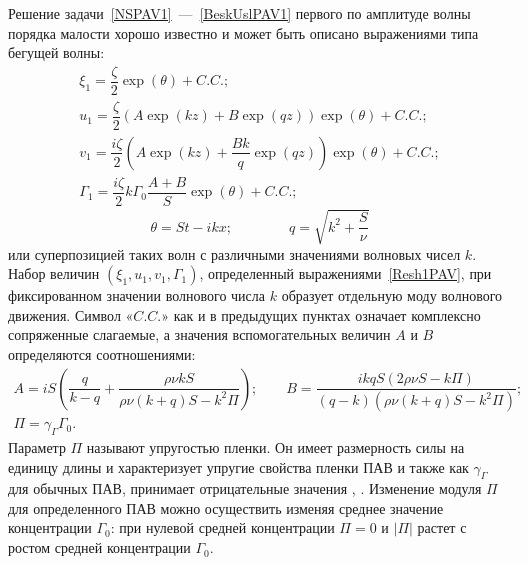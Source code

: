   Решение задачи~\eqref{NSPAV1}~---~\eqref{BeskUslPAV1} первого по амплитуде волны порядка малости хорошо известно \parencite{BelonozhkoPav2004, vakbib1} и может быть описано выражениями типа бегущей волны:
  \begin{equation}
  \begin{matrix}
  \xi_{1}=\dfrac{\zeta}{2} \exp \left( \theta \right) +C.C.;\\
  u_{1}=\dfrac{\zeta}{2}\left(A \exp \left( k z \right) +B \exp \left( q z \right) \right) \exp \left( \theta \right) +C.C.;\\
  v_{1}=\dfrac{i \zeta}{2}\left(A \exp \left( k z \right) +\dfrac{B k}{q}\exp \left( q z \right) \right) \exp \left( \theta \right) +C.C.;\\
    \Gamma_{1}=\dfrac{i \zeta}{2} k \Gamma_{0} \dfrac{A+B}{S} \exp \left( \theta \right) +C.C.;
  \end{matrix}
  \label{Resh1PAV}
  \end{equation}
  \begin{equation*}
  \qquad \qquad \theta=S t - i k x; \qquad \qquad q=\sqrt{k^{2} + \dfrac{S}{\nu}} \qquad \qquad
  \end{equation*}
или суперпозицией таких волн с различными значениями волновых чисел $ k $. Набор величин $ \left( \xi_{1}, u_{1}, v_{1}, \Gamma_{1} \right) $, определенный выражениями~\eqref{Resh1PAV}, при фиксированном значении волнового числа $ k $ образует отдельную моду волнового движения. Символ  «$ C.C. $» как и в предыдущих пунктах означает комплексно сопряженные слагаемые, а значения вспомогательных величин $ A $ и $ B $ определяются соотношениями: 
\begin{gather*}
A=i S \left( \dfrac{q}{k - q} + \dfrac{\rho \nu k S}{\rho \nu \left( k+q \right) S - k^{2} \Pi}\right); \qquad B=\dfrac{i k q S \left( 2\rho \nu S - k \Pi \right)}{\left( q-k \right) \left( \rho \nu \left( k+q \right) S - k^{2} \Pi \right)};
\\
\Pi = \gamma_{\Gamma} \Gamma_{0}.
\end{gather*}
Параметр $ \Pi $ называют упругостью пленки. Он имеет размерность силы на единицу длины и характеризует упругие свойства пленки ПАВ \parencite{??} и также как $ \gamma_{\Gamma} $ для обычных ПАВ, принимает отрицательные значения \parencite{lucassen1969eh}, \parencite{??}. Изменение модуля $ \Pi $ для определенного ПАВ можно осуществить изменяя среднее значение концентрации $ \Gamma_{0} $: при нулевой средней концентрации $ \Pi=0 $ и $ \vert \Pi \vert $ растет с ростом средней концентрации $ \Gamma_{0} $. 

